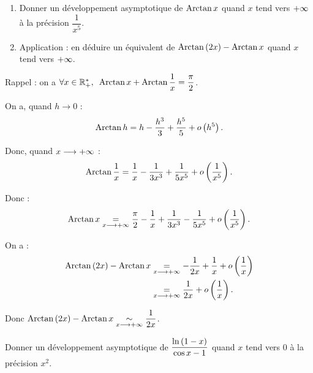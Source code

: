 \begin{exoex}
\begin{enumerate}
    \item Donner un développement asymptotique de \(\operatorname{Arctan} x\) quand \(x\) tend vers \(+\infty\) à la précision \(\dfrac{1}{x^5}\). \\
    \item Application : en déduire un équivalent de \(\operatorname{Arctan}\left(2x\right)-\operatorname{Arctan} x\) quand \(x\) tend vers \(+\infty\).
\end{enumerate}
\end{exoex}

\begin{corr}[1]
Rappel : on a \(\quantifs{\forall x\in\Rps}\Arctan x+\Arctan\dfrac{1}{x}=\dfrac{\pi}{2}\).

On a, quand \(h\to0\) : \[\operatorname{Arctan} h=h-\dfrac{h^3}{3}+\dfrac{h^5}{5}+o\left(h^5\right).\]

Donc, quand \(x\longrightarrow+\infty\) : \[\operatorname{Arctan}\dfrac{1}{x}=\dfrac{1}{x}-\dfrac{1}{3x^3}+\dfrac{1}{5x^5}+o\left(\dfrac{1}{x^5}\right).\]

Donc : \[\operatorname{Arctan} x\underset{x\longrightarrow+\infty}{=}\dfrac{\pi}{2}-\dfrac{1}{x}+\dfrac{1}{3x^3}-\dfrac{1}{5x^5}+o\left(\dfrac{1}{x^5}\right).\]
\end{corr}

\begin{corr}[2]
On a : \[\begin{aligned}
\operatorname{Arctan}\left(2x\right)-\operatorname{Arctan} x&\underset{x\longrightarrow+\infty}{=}-\dfrac{1}{2x}+\dfrac{1}{x}+o\left(\dfrac{1}{x}\right) \\
&\underset{x\longrightarrow+\infty}{=}\dfrac{1}{2x}+o\left(\dfrac{1}{x}\right).
\end{aligned}\]

Donc \(\operatorname{Arctan}\left(2x\right)-\operatorname{Arctan} x\underset{x\longrightarrow+\infty}{\sim}\dfrac{1}{2x}\).
\end{corr}

\begin{exoex}
Donner un développement asymptotique de \(\dfrac{\ln\left(1-x\right)}{\cos x-1}\) quand \(x\) tend vers \(0\) à la précision \(x^2\).
\end{exoex}

